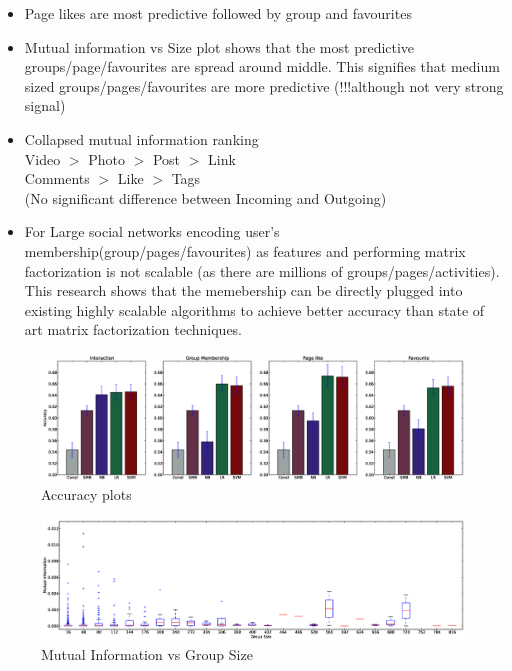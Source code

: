 \begin{itemize}
  \item Page likes are most predictive followed by group and favourites
  \item Mutual information vs Size plot shows that the most predictive groups/page/favourites are spread around middle. This signifies that medium sized groups/pages/favourites are more predictive (!!!although not very strong signal)
  \item Collapsed mutual information ranking \\Video $>$ Photo $>$ Post $>$ Link\\ Comments $>$ Like $>$ Tags\\
   (No significant difference between Incoming and Outgoing)
   \item For Large social networks encoding user's membership(group/pages/favourites) as features and performing matrix factorization is not scalable (as there are millions of groups/pages/activities). This research shows that the memebership can be directly plugged into existing highly scalable algorithms to achieve better accuracy than state of art matrix factorization techniques. 
\end{itemize}


\begin{figure}
\centering
\includegraphics[scale=0.25]{data/accuracy.eps}
\caption{Accuracy plots}
\label{Fig: Accuracy}
\end{figure}

\begin{figure}
\centering
\includegraphics[scale=0.25]{data/MIvsGroupSizeBox.eps}
\caption{Mutual Information vs Group Size}
\label{Fig: Mutual Information vs Group Size}
\end{figure}

